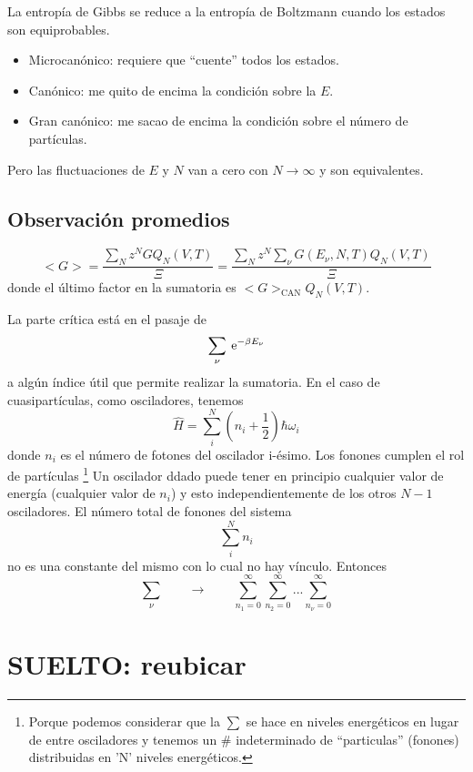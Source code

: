 \documentclass[10pt,oneside]{CBFT_book}
\begin{document}
La entropía de Gibbs se reduce a la entropía de Boltzmann cuando los estados son equiprobables.

\begin{itemize}
 \item Microcanónico: requiere que ``cuente'' todos los estados.
 \item Canónico: me quito de encima la condición sobre la $E$.
 \item Gran canónico: me sacao de encima la condición sobre el número de partículas.
\end{itemize}

Pero las fluctuaciones de $E$ y $N$ van a cero con $N \to \infty$ y son equivalentes.


\subsection{Observación promedios}

\[
	<G> = \frac{\sum_N z^N G Q_N(V,T) }{\Xi} = \frac{\sum_N z^N \sum_\nu G(E_\nu, N, T) Q_N(V,T) }{\Xi}
\]
donde el último factor en la sumatoria es $<G>_{\text{CAN}} Q_N(V,T)$.

La parte crítica está en el pasaje de 
\[
	\sum_\nu \:\mathrm{e}^{ -\beta E_\nu }
\]
a algún índice útil que permite realizar la sumatoria. En el caso de cuasipartículas, como osciladores, 
tenemos
\[
	\hat{H} = \sum_i^N \left( n_i + \frac{1}{2} \right) \hbar \omega_i 
\]
donde $ n_i $ es el número de fotones del oscilador i-ésimo. Los fonones cumplen el rol de partículas
\footnote{Porque podemos considerar que la $\sum$ se hace en niveles energéticos en lugar de entre osciladores
y tenemos un \# indeterminado de ``particulas'' (fonones) distribuidas en 'N' niveles energéticos.}
Un oscilador ddado puede tener en principio cualquier valor de energía (cualquier valor de $ n_i $) y esto 
independientemente de los otros $ N-1 $ osciladores. El número total de fonones del sistema
\[
	\sum_i^N n_i
\]
no es una constante del mismo con lo cual no hay vínculo. Entonces
\[
	\sum_\nu \qquad \rightarrow \qquad \sum_{n_1=0}^\infty \sum_{n_2=0}^\infty ... \sum_{n_\nu=0}^\infty
\]


\section{SUELTO: reubicar}
\end{document}

